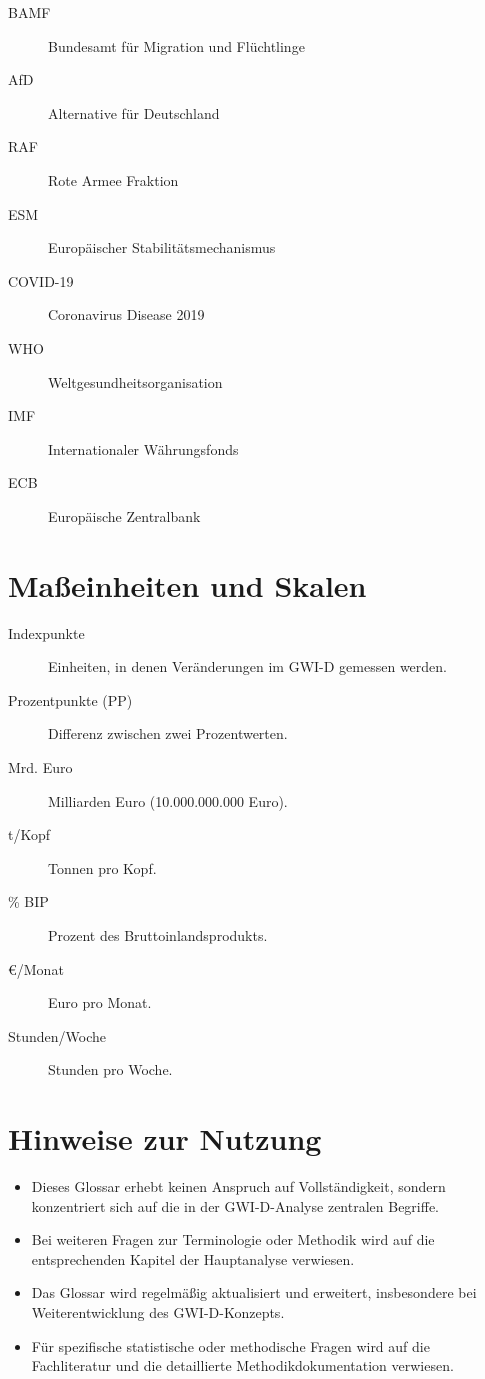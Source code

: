 \begin{description}
    \item[BAMF] Bundesamt für Migration und Flüchtlinge
    \item[AfD] Alternative für Deutschland
    \item[RAF] Rote Armee Fraktion
    \item[ESM] Europäischer Stabilitätsmechanismus
    \item[COVID-19] Coronavirus Disease 2019
    \item[WHO] Weltgesundheitsorganisation
    \item[IMF] Internationaler Währungsfonds
    \item[ECB] Europäische Zentralbank
\end{description}

\section{Maßeinheiten und Skalen}

\begin{description}
    \item[Indexpunkte] Einheiten, in denen Veränderungen im GWI-D gemessen werden.
    \item[Prozentpunkte (PP)] Differenz zwischen zwei Prozentwerten.
    \item[Mrd. Euro] Milliarden Euro (10.000.000.000 Euro).
    \item[t/Kopf] Tonnen pro Kopf.
    \item[\% BIP] Prozent des Bruttoinlandsprodukts.
    \item[€/Monat] Euro pro Monat.
    \item[Stunden/Woche] Stunden pro Woche.
\end{description}

\section*{Hinweise zur Nutzung}

\begin{itemize}
    \item Dieses Glossar erhebt keinen Anspruch auf Vollständigkeit, sondern konzentriert sich auf die in der GWI-D-Analyse zentralen Begriffe.
    \item Bei weiteren Fragen zur Terminologie oder Methodik wird auf die entsprechenden Kapitel der Hauptanalyse verwiesen.
    \item Das Glossar wird regelmäßig aktualisiert und erweitert, insbesondere bei Weiterentwicklung des GWI-D-Konzepts.
    \item Für spezifische statistische oder methodische Fragen wird auf die Fachliteratur und die detaillierte Methodikdokumentation verwiesen.
\end{itemize}

\endinput